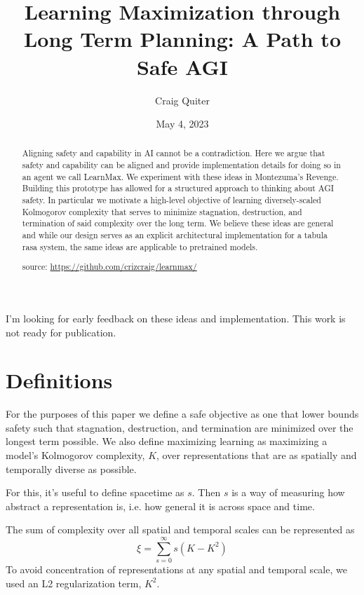 \documentclass{article}
\title{Learning Maximization through Long Term Planning: A Path to Safe AGI}
\author{Craig Quiter}
\date{May 4, 2023}
\begin{document}
\maketitle

\begin{tcolorbox}
I'm looking for early feedback on these ideas and implementation. This work is not ready for publication.
\end{tcolorbox}

\begin{abstract}
Aligning safety and capability in AI cannot be a contradiction.
Here we argue that safety and capability can be aligned and provide implementation details for doing so in an agent we call LearnMax. We experiment with these ideas in Montezuma's Revenge. Building this prototype has allowed for a structured approach to thinking about AGI safety. In particular we motivate a high-level objective of learning diversely-scaled Kolmogorov complexity that serves to minimize stagnation, destruction, and termination of said complexity over the long term. We believe these ideas are general and while our design serves as an explicit architectural implementation for a tabula rasa system, the same ideas are applicable to pretrained models.

source: \href{https://github.com/crizcraig/learnmax/}{https://github.com/crizcraig/learnmax/}
\end{abstract}

\setcounter{secnumdepth}{-1}

\section{Definitions}

For the purposes of this paper we define a safe objective as one that lower bounds safety such that stagnation, destruction, and termination are minimized over the longest term possible.  We also define maximizing learning as maximizing a model's Kolmogorov complexity\cite{li2008introduction}, $K$, over representations that are as spatially and temporally diverse as possible.

For this, it's useful to define spacetime as $s$. Then $s$ is a way of measuring how abstract a representation is, i.e. how general it is across space and time.

The sum of complexity over all spatial and temporal scales can be represented as
\[
\xi = \sum_{s=0}^{\infty}s (K - K^2)
\]
To avoid concentration of representations at any spatial and temporal scale, we used an L2 regularization term, $K^2$.
\end{document}
